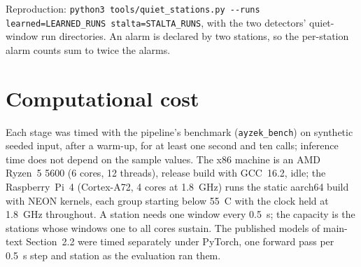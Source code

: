 \documentclass[11pt,a4paper]{article}
\newcommand{\tool}[1]{\nolinkurl{#1}}
\begin{document}
\noindent Reproduction: \tool{python3 tools/quiet_stations.py --runs
learned=LEARNED_RUNS stalta=STALTA_RUNS}, with the two detectors' quiet-window run
directories. An alarm is
declared by two stations, so the per-station alarm counts sum to twice the
alarms.

\clearpage
\section{Computational cost}\label{s:cost}

Each stage was timed with the pipeline's benchmark (\tool{ayzek_bench}) on
synthetic seeded input, after a warm-up, for at least one second and ten
calls; inference time does not depend on the sample values. The x86 machine is
an AMD Ryzen~5 5600 (6 cores, 12 threads), release build with GCC~16.2, idle;
the Raspberry~Pi~4 (Cortex-A72, 4 cores at 1.8~GHz) runs the static aarch64
build with NEON kernels, each group starting below 55~\textdegree C with the
clock held at 1.8~GHz throughout. A station needs one window every 0.5~s; the
capacity is the stations whose windows one to all cores sustain. The published
models of main-text Section~2.2 were timed separately under PyTorch, one forward
pass per 0.5~s step and station as the evaluation ran them.
\end{document}
